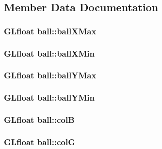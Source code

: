 \subsection{Member Data Documentation}
\hypertarget{classball_a5c8547e78a72e0fd0ab48ea8b9afa2ab}{
\subsubsection[{ball\-X\-Max}]{\setlength{\rightskip}{0pt plus 5cm}G\-Lfloat ball\-::ball\-X\-Max}}\label{classball_a5c8547e78a72e0fd0ab48ea8b9afa2ab}
\hypertarget{classball_a52ad45fd0de8488d56fb32149038b261}{
\subsubsection[{ball\-X\-Min}]{\setlength{\rightskip}{0pt plus 5cm}G\-Lfloat ball\-::ball\-X\-Min}}\label{classball_a52ad45fd0de8488d56fb32149038b261}
\hypertarget{classball_ae35c5b58dc2c8683a7f89c7ff71c55d8}{
\subsubsection[{ball\-Y\-Max}]{\setlength{\rightskip}{0pt plus 5cm}G\-Lfloat ball\-::ball\-Y\-Max}}\label{classball_ae35c5b58dc2c8683a7f89c7ff71c55d8}
\hypertarget{classball_a22d4a2799b1ac4abfd5fe61e28dddfd1}{
\subsubsection[{ball\-Y\-Min}]{\setlength{\rightskip}{0pt plus 5cm}G\-Lfloat ball\-::ball\-Y\-Min}}\label{classball_a22d4a2799b1ac4abfd5fe61e28dddfd1}
\hypertarget{classball_a9084a7be3eec66abdc6f76bbc2f97d1c}{
\subsubsection[{col\-B}]{\setlength{\rightskip}{0pt plus 5cm}G\-Lfloat ball\-::col\-B}}\label{classball_a9084a7be3eec66abdc6f76bbc2f97d1c}
\hypertarget{classball_ad5879b3b24b32224de452fbd4eef9944}{
\subsubsection[{col\-G}]{\setlength{\rightskip}{0pt plus 5cm}G\-Lfloat ball\-::col\-G}}\label{classball_ad5879b3b24b32224de452fbd4eef9944}
